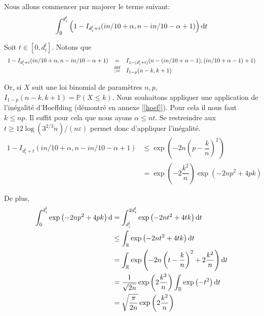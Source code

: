 
Nous allons commencer par majorer le terme suivant: 
\[
    \int_{0}^{d_i^l}\left( 1 - I_{d_i^l + t}(in/10 + \alpha, n - in/10 -  \alpha + 1) \right) \mathrm{d} t    
\]

Soit \(t \in [0, d_i^l]\). Notons que 
\[
    \begin{array}[]{rcl}
        1 - I_{d_i^l + t}(in/10 + \alpha, n - in/10 -  \alpha + 1) & = & I_{1 - (d_i^l + t)}(n - (in/10 + \alpha - 1), (in/10 + \alpha - 1) + 1)\\
        & \overset{\text{déf}}{:=} & I_{1 - p}(n - k, k + 1)  
    \end{array}  
\]

Or, si \(X\) suit une loi binomial de paramètres \(n,p\), \(I_{1 - p}(n - k, k + 1)  = \mathbb P(X \leq k)\). Nous souhaitons appliquer une application de l'inégalité d'{\sc Hoeffding} (démontré en annexe [\ref{hoef}]). Pour cela il nous faut \(k \leq np\). Il suffit pour cela que nous ayons \(\alpha \leq nt\). Se restreindre aux \(t \geq 12\log(3^{2/3}n)/(n\varepsilon)\) permet donc d'appliquer l'inégalité.
\begin{align*}
    1 - I_{d_i^l + t}(in/10 + \alpha, n - in/10 -  \alpha + 1) & \leq \exp\left( -2n\left( p - \dfrac{k}{n} \right)^2 \right)\\
    & = \exp\left( - 2\dfrac{k^2}{n} \right)\exp\left( -2np^2 + 4pk \right)
\end{align*}

De plus,
\begin{align*}
    \int_0^{d_i^l}\exp\left( -2np^2 + 4pk \right)\mathrm{d} & = \int_{d_i^l}^{{2d_i^l}}\exp\left( -2nt^2 + 4tk \right)\mathrm{d} t \\
    & \leq \int_{\mathbb{R}}\exp\left( -2nt^2 + 4tk \right)\mathrm{d} t \\
    & = \int_{\mathbb{R}}\exp\left( -2n\left(t - \dfrac{k}{n}\right)^2 + 2 \dfrac{k^2}{n} \right)\mathrm{d} t \\
    & = \dfrac{1}{\sqrt{2n}}\exp\left( 2 \dfrac{k^2}{n} \right) \int_{\mathbb{R}}\exp\left( -t^2 \right)\mathrm{d} t \\
    & = \sqrt{\dfrac{\pi}{2n}}\exp\left( 2 \dfrac{k^2}{n} \right)\\
\end{align*}

